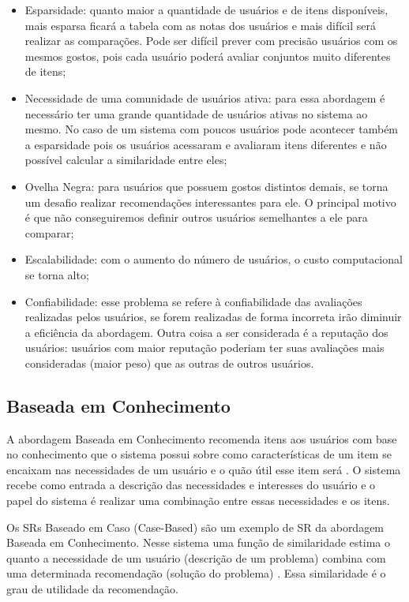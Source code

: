 \begin{itemize}
\item Esparsidade: quanto maior a quantidade de usuários e de itens disponíveis, mais esparsa ficará a tabela com as
notas dos usuários e mais difícil será realizar as comparações. Pode ser difícil prever com precisão usuários com os
mesmos gostos, pois cada usuário poderá avaliar conjuntos muito diferentes de itens;
\item Necessidade de uma comunidade de usuários ativa: para essa abordagem é necessário ter uma grande quantidade de
usuários ativas no sistema ao mesmo. No caso de um sistema com poucos usuários pode acontecer também a esparsidade
pois os usuários acessaram e avaliaram itens diferentes e  não possível calcular a similaridade entre eles;
\item Ovelha Negra: para usuários que possuem gostos distintos demais, se torna um desafio realizar recomendações
interessantes para ele. O principal motivo é que não conseguiremos definir outros usuários semelhantes a ele para comparar;
\item Escalabilidade: com o aumento do número de usuários, o custo computacional se torna alto;
\item Confiabilidade: esse problema se refere à confiabilidade das avaliações realizadas pelos usuários, se forem
realizadas de forma incorreta irão diminuir a eficiência da abordagem. Outra coisa a ser considerada é a reputação dos
usuários: usuários com maior reputação poderiam ter suas avaliações mais consideradas (maior peso) que as outras de
outros usuários.
\end{itemize}

\subsection{Baseada em Conhecimento}

A abordagem Baseada em Conhecimento recomenda itens aos usuários com base no conhecimento que o sistema possui sobre
como características de um item se encaixam nas necessidades de um usuário e o quão útil esse item será
\cite{ricci2011introduction}. O sistema recebe como entrada a descrição das necessidades e interesses do usuário e o
papel do sistema é realizar uma combinação entre essas necessidades e os itens.

Os SRs Baseado em Caso (Case-Based) são um exemplo de SR da abordagem Baseada em Conhecimento. Nesse sistema uma
função de similaridade estima o quanto a necessidade de um usuário (descrição de um problema) combina com uma
determinada recomendação (solução do problema) \cite{ricci2011introduction}. Essa similaridade é o grau de utilidade
da recomendação.

